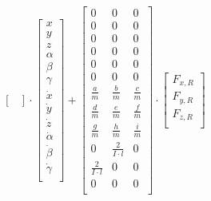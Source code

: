 \begin{equation*}
\begin{bmatrix}
    \end{bmatrix}
    \cdot
    \begin{bmatrix}
        x\\
        y\\
        z\\
        \alpha\\
        \beta\\
        \gamma\\
        \dot{x}\\
        \dot{y}\\
        \dot{z}\\
        \dot{\alpha}\\
        \dot{\beta}\\
        \dot{\gamma}\\
    \end{bmatrix}
    +
    \begin{bmatrix}
        0 & 0 & 0\\
        0 & 0 & 0\\
        0 & 0 & 0\\
        0 & 0 & 0\\
        0 & 0 & 0\\
        0 & 0 & 0\\
        \frac{a}{m} & \frac{b}{m} & \frac{c}{m}\\
        \frac{d}{m} & \frac{e}{m} & \frac{f}{m}\\
        \frac{g}{m} & \frac{h}{m} & \frac{i}{m}\\
        0 & \frac{2}{I \cdot l} & 0\\
        \frac{2}{I \cdot l} & 0 & 0\\
        0 & 0 & 0\\
    \end{bmatrix}
    \cdot
    \begin{bmatrix}
        F_{x,R}\\
        F_{y,R}\\
        F_{z,R}\\
    \end{bmatrix}
\end{equation*}

